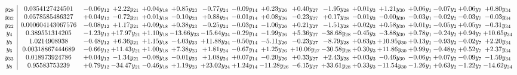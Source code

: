 \documentclass[9pt]{article}
\begin{document}
\[\begin{array}{c| c c@{\hskip 2pt} c@{\hskip 2pt} c@{\hskip 2pt} c@{\hskip 2pt} c@{\hskip 2pt} c@{\hskip 2pt} c@{\hskip 2pt} c@{\hskip 2pt} c@{\hskip 2pt} c@{\hskip 2pt} c@{\hskip 2pt} c@{\hskip 2pt} c@{\hskip 2pt} c@{\hskip 2pt} c@{\hskip 2pt} }
 y_{29}   &  0.0354127424501 & -0.06 y_{12} & +  2.22 y_{21} & +  0.04 y_{18} & +  0.85 y_{23} & -0.77 y_{24} & -0.09 y_{14} & +  0.23 y_{26} & +  0.40 y_{27} & -1.95 y_{28} & +  0.01 y_{3} & +  1.21 y_{30} & +  0.06 y_{1} & -0.07 y_{2} & +  0.06 y_{7} & +  0.80 y_{34}\\
 y_{32}   &  0.0578585486327 & +  0.04 y_{12} & -0.72 y_{21} & +  0.01 y_{18} & -0.10 y_{23} & +  0.88 y_{24} & -0.01 y_{14} & +  0.08 y_{26} & -0.23 y_{27} & +  0.17 y_{28} & -0.01 y_{3} & -0.00 y_{30} & -0.03 y_{1} & -0.02 y_{2} & -0.03 y_{7} & -0.03 y_{34}\\
 y_{22}   &  0.000604143067576 & -0.08 y_{12} & +  1.17 y_{21} & +  0.09 y_{18} & +  0.38 y_{23} & -0.25 y_{24} & -0.03 y_{14} & -1.06 y_{26} & +  0.21 y_{27} & -1.51 y_{28} & +  0.02 y_{3} & +  0.58 y_{30} & +  0.01 y_{1} & -0.05 y_{2} & +  0.05 y_{7} & -0.31 y_{34}\\
 y_{4}   &  0.389551314205 & -1.23 y_{12} & + 17.97 y_{21} & +  1.10 y_{18} & -13.66 y_{23} & -15.64 y_{24} & -0.29 y_{14} & -1.99 y_{26} & +  5.36 y_{27} & -38.68 y_{28} & -0.45 y_{3} & -3.88 y_{30} & +  0.78 y_{1} & -0.24 y_{2} & +  0.94 y_{7} & + 10.65 y_{34}\\
 y_{5}   &  1.0214908938 & -0.48 y_{12} & +  6.36 y_{21} & +  1.15 y_{18} & -4.03 y_{23} & + 11.88 y_{24} & -0.50 y_{14} & -5.11 y_{26} & -0.23 y_{27} & -8.79 y_{28} & +  0.63 y_{3} & + 10.95 y_{30} & +  0.13 y_{1} & -0.93 y_{2} & -0.02 y_{7} & +  2.20 y_{34}\\
 y_{6}   &  0.00318867444689 & -0.66 y_{12} & + 11.43 y_{21} & +  1.00 y_{18} & +  7.38 y_{23} & +  1.81 y_{24} & -0.67 y_{14} & +  1.25 y_{26} & + 10.06 y_{27} & -30.58 y_{28} & +  0.30 y_{3} & + 11.86 y_{30} & +  0.99 y_{1} & -0.48 y_{2} & +  0.52 y_{7} & +  2.37 y_{34}\\
 y_{33}   &  0.018973924786 & +  0.04 y_{12} & -1.34 y_{21} & -0.08 y_{18} & -0.01 y_{23} & +  1.08 y_{24} & +  0.07 y_{14} & -0.20 y_{26} & +  0.33 y_{27} & +  2.43 y_{28} & +  0.03 y_{3} & -0.46 y_{30} & -0.06 y_{1} & +  0.07 y_{2} & -0.09 y_{7} & -1.59 y_{34}\\
 y_{8}   &  0.95583753239 & +  0.79 y_{12} & -34.47 y_{21} & -0.46 y_{18} & +  1.19 y_{23} & + 23.02 y_{24} & +  1.24 y_{14} & -11.28 y_{26} & -6.15 y_{27} & + 33.61 y_{28} & +  0.33 y_{3} & -11.54 y_{30} & -1.26 y_{1} & +  0.63 y_{2} & -1.22 y_{7} & -14.62 y_{34}\\

\end{array}\]
\end{document}
